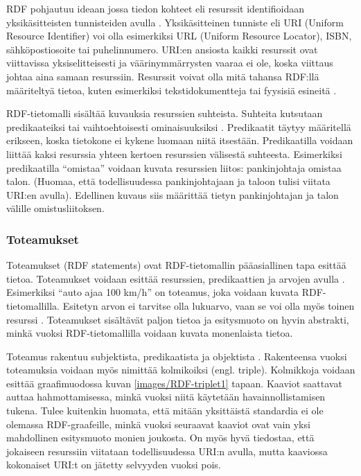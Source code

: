 \documentclass[finnish, 12pt, a4paper, elec, utf8, pdfa, online]{aaltothesis}
\begin{document}
RDF pohjautuu ideaan jossa tiedon kohteet eli resurssit identifioidaan yksikäsitteisten tunnisteiden avulla \cite{RDF_specification}. Yksikäsitteinen tunniste eli URI (Uniform Resource Identifier) voi olla esimerkiksi URL (Uniform Resource Locator), ISBN, sähköpostiosoite tai puhelinnumero. URI:en ansiosta kaikki resurssit ovat viittavissa yksiselitteisesti ja väärinymmärrysten vaaraa ei ole, koska viittaus johtaa aina samaan resurssiin. Resurssit voivat olla mitä tahansa RDF:llä määriteltyä tietoa, kuten esimerkiksi tekstidokumentteja tai fyysisiä esineitä \cite{RDF_specification}.

RDF-tietomalli sisältää kuvauksia resurssien suhteista. Suhteita kutsutaan predikaateiksi tai vaihtoehtoisesti ominaisuuksiksi \cite{Antoniou}. Predikaatit täytyy määritellä erikseen, koska tietokone ei kykene luomaan niitä itsestään. Predikaatilla voidaan liittää kaksi resurssia yhteen kertoen resurssien välisestä suhteesta. Esimerkiksi predikaatilla ``omistaa'' voidaan kuvata resurssien liitos: pankinjohtaja omistaa talon. (Huomaa, että todellisuudessa pankinjohtajaan ja taloon tulisi viitata URI:en avulla). Edellinen kuvaus siis määrittää tietyn pankinjohtajan ja talon välille omistusliitoksen.

\subsubsection{Toteamukset}

Toteamukset (RDF statements) ovat RDF-tietomallin pääasiallinen tapa esittää tietoa. Toteamukset voidaan esittää resurssien, predikaattien ja arvojen avulla \cite{Antoniou}. Esimerkiksi ``auto ajaa 100 km/h'' on toteamus, joka voidaan kuvata RDF-tietomallilla. Esitetyn arvon ei tarvitse olla lukuarvo, vaan se voi olla myös toinen resurssi \cite{Antoniou}\cite{IEEE_XML}. Toteamukset sisältävät paljon tietoa ja esitysmuoto on hyvin abstrakti, minkä vuoksi RDF-tietomallilla voidaan kuvata monenlaista tietoa.

Toteamus rakentuu subjektista, predikaatista ja objektista \cite{lassila_dissertion}. Rakenteensa vuoksi toteamuksia voidaan myös nimittää kolmikoiksi (engl. triple). Kolmikkoja voidaan esittää graafimuodossa kuvan \ref{images/RDF-triplet1} tapaan. Kaaviot saattavat auttaa hahmottamisessa, minkä vuoksi niitä käytetään havainnollistamisen tukena. Tulee kuitenkin huomata, että mitään yksittäistä standardia ei ole olemassa RDF-graafeille, minkä vuoksi seuraavat kaaviot ovat vain yksi mahdollinen esitysmuoto monien joukosta. On myös hyvä tiedostaa, että jokaiseen resurssiin viitataan todellisuudessa URI:n avulla, mutta kaaviossa kokonaiset URI:t on jätetty selvyyden vuoksi pois.
\end{document}
